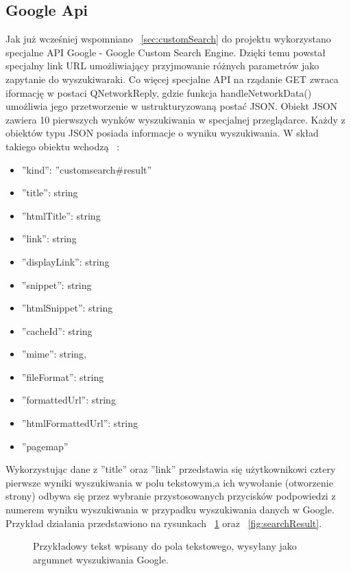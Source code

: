 \documentclass[twoside,a4paper]{book}
\begin{document}
\subsection{Google Api}
Jak już wcześniej wspomniano ~\ref{sec:customSearch} do projektu wykorzystano specjalne API Google - Google Custom Search Engine. Dzięki temu powstał specjalny link URL umożliwiający przyjmowanie różnych parametrów jako zapytanie do wyszukiwaraki. Co więcej specjalne API na rządanie GET zwraca iformację w postaci QNetworkReply, gdzie funkcja handleNetworkData() umożliwia jego przetworzenie w ustrukturyzowaną postać JSON. Obiekt JSON zawiera 10 pierwszych wynków wyszukiwania w specjalnej przeglądarce. Każdy z obiektów typu JSON posiada informacje o wyniku wyszukiwania. W skład takiego obiektu wchodzą ~\cite{googleJSON}:
\begin{itemize}
\item ''kind'': ''customsearch\#result''
\item ''title'': string
\item ''htmlTitle'': string
\item ''link'': string
\item ''displayLink'': string
\item ''snippet'': string
\item ''htmlSnippet'': string
\item  ''cacheId'': string
\item ''mime'': string,
\item ''fileFormat'': string
\item ''formattedUrl'': string
\item ''htmlFormattedUrl'': string
\item ''pagemap''
\end{itemize} 
Wykorzystując dane z ''title'' oraz ''link'' przedstawia się użytkownikowi cztery pierwsze wyniki wyszukiwania w polu tekstowym,a ich wywołanie (otworzenie strony) odbywa się przez wybranie przystosowanych przycisków podpowiedzi z numerem wyniku wyszukiwania w przypadku wyszukiwania danych w Google. Przykład działania przedstawiono na rysunkach ~\ref{fig:googleSearch} oraz ~\ref{fig:searchResult}. 

			\begin{figure}[!h]
		\centering
		\caption{Przykładowy tekst wpisany do pola tekstowego, wysyłany jako argumnet wyszukiwania Google.}
		\label{fig:googleSearch}
		\end{figure}
\end{document}
